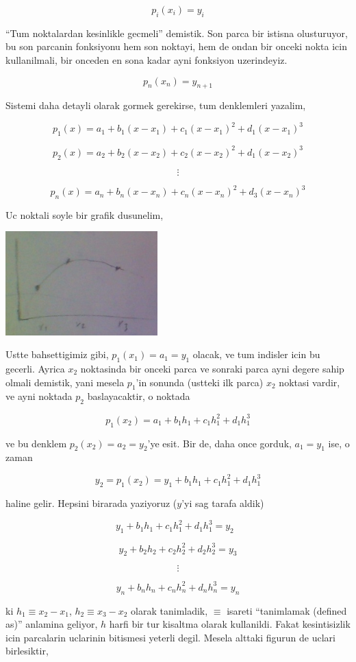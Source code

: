 \documentclass[12pt,fleqn]{article}\usepackage{common}
\begin{document}
\[ p_i(x_i) = y_i \]

``Tum noktalardan kesinlikle gecmeli'' demistik. Son parca bir istisna
olusturuyor, bu son parcanin fonksiyonu hem son noktayi, hem de ondan bir
onceki nokta icin kullanilmali, bir onceden en sona kadar ayni fonksiyon
uzerindeyiz. 

\[ p_{n}(x_n) = y_{n+1} \]

Sistemi daha detayli olarak gormek gerekirse, tum denklemleri yazalim,

\[ p_1(x)  = a_1 + b_1(x-x_1) + c_1(x-x_1)^2 + d_1(x-x_1)^3\]

\[ p_2(x)  = a_2 + b_2(x-x_2) + c_2(x-x_2)^2 + d_1(x-x_2)^3\]

\[ \vdots \]

\[ p_n(x)  = a_n + b_n(x-x_n) + c_n(x-x_n)^2 + d_3(x-x_n)^3\]

Uc noktali soyle bir grafik dusunelim,

\includegraphics[height=4cm]{spline2.png}

Ustte bahsettigimiz gibi, $p_1(x_1) = a_1 = y_1$ olacak, ve tum indisler
icin bu gecerli. Ayrica $x_2$ noktasinda bir onceki parca ve sonraki parca
ayni degere sahip olmali demistik, yani mesela $p_1$'in sonunda (ustteki
ilk parca) $x_2$ noktasi vardir, ve ayni noktada $p_2$ baslayacaktir, o
noktada 

\[ p_1(x_2) = a_1 + b_1h_1 + c_1h_1^2 + d_1h_1^3  \]

ve bu denklem $p_2(x_2) = a_2 = y_2$'ye esit. Bir de, daha once gorduk, $a_1 =
y_1$ 
ise, o zaman 

\[ y_2 = p_1(x_2) = y_1 + b_1h_1 + c_1h_1^2 + d_1h_1^3 \]

haline gelir. Hepsini birarada yaziyoruz ($y$'yi sag tarafa aldik)

\[ y_1 + b_1h_1 + c_1h_1^2 + d_1h_1^3 = y_2 \ \ \ \label{2} \]

\[ y_2 + b_2h_2 + c_2h_2^2 + d_2h_2^3 = y_3 \]

\[ \vdots \]

\[ y_n + b_nh_n + c_nh_n^2 + d_nh_n^3 = y_n \]

ki $h_1 \equiv x_2 - x_1$, $h_2 \equiv x_3 - x_2$ olarak tanimladik,
$\equiv$ isareti ``tanimlamak (defined as)'' anlamina geliyor, $h$
harfi bir tur kisaltma olarak kullanildi. Fakat kesintisizlik icin
parcalarin uclarinin bitismesi yeterli degil. Mesela alttaki figurun de
uclari birlesiktir,
\end{document}
